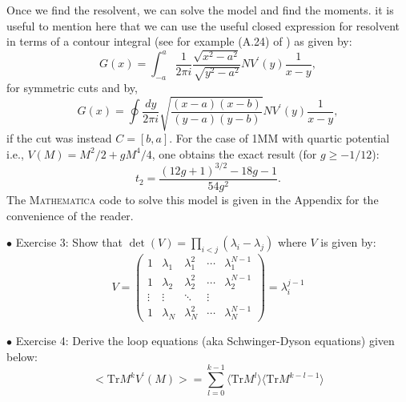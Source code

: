 \documentclass[11pt]{article}
\newcommand{\MA}{\textsc{Mathematica }}
\begin{document}
Once we find the resolvent, we can solve the model and find the moments. it is useful to mention here that we can use the useful closed expression for resolvent in terms of a contour integral (see for example (A.24) of \cite{Migdal:1983qrz})
as given by:
\begin{equation}
	G(x) = \int_{-a}^{a} \frac{1}{2\pi i} \frac{\sqrt{x^2-a^2}}{\sqrt{y^2-a^2}} N V^{\prime}(y) \frac{1}{x-y}, 
\end{equation}
for symmetric cuts and by,
\begin{equation}
	G(x) = \oint \frac{dy}{2\pi i} \sqrt{\frac{(x-a) (x-b)}{(y-a)(y-b)}}  N V^{\prime}(y) \frac{1}{x-y}, 
\end{equation}
if the cut was instead $ C= [b,a]$. For the case of 1MM with quartic potential i.e., $V(M) = M^2/2 + gM^4/4$, one obtains the exact result (for $g \ge -1/12$):
\begin{equation}
\label{eq:exact1MM} 
t_{2} = \frac{(12 g+1)^{3/2}-18 g-1}{54 g^2}. 
\end{equation}
The \MA  code to solve this model is given in the Appendix for the convenience of the reader. 


\begin{mdframed}[backgroundcolor=blue!3] 
	\textsc{} 
	$\bullet$ Exercise 3: Show that $\det(V) = \prod_{i<j} (\lambda_i - \lambda_j)$ where $V$ is given by: 
	\begin{equation*}
		V = 
		\begin{pmatrix}
			1 & \lambda_1 & \lambda_{1}^{2} & \cdots & \lambda_{1}^{N-1} \\
			1 & \lambda_2 & \lambda_{2}^{2} & \cdots & \lambda_{2}^{N-1} \\ 
			\vdots  & \vdots  & \ddots & \vdots  \\
			1 & \lambda_N & \lambda_{N}^{2} & \cdots & \lambda_{N}^{N-1} 
		\end{pmatrix} = \lambda_{i}^{j-1} 
	\end{equation*}
	
\end{mdframed} 

\begin{mdframed}[backgroundcolor=blue!3] 
	\textsc{} 
	$\bullet$ Exercise 4: Derive the loop equations (aka Schwinger-Dyson equations) given below: \\ 
	\begin{equation}
		\label{eq:LE} 
		\Big< \mbox{Tr} M^{k} V^{\prime}(M) \Big> = \sum_{l=0}^{k-1} \langle \mbox{Tr} M^{l} \rangle  \langle \mbox{Tr} M^{k-l-1} \rangle
		\nonumber
	\end{equation} 
\end{mdframed} 
\end{document}
